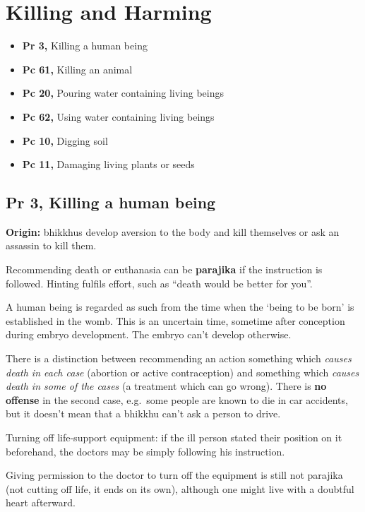 \chapter{Killing and Harming}

\begin{itemize}
\tightlist
\item
  \textbf{Pr 3,} Killing a human being
\item
  \textbf{Pc 61,} Killing an animal
\item
  \textbf{Pc 20,} Pouring water containing living beings
\item
  \textbf{Pc 62,} Using water containing living beings
\item
  \textbf{Pc 10,} Digging soil
\item
  \textbf{Pc 11,} Damaging living plants or seeds
\end{itemize}

\section{Pr 3, Killing a human being}


\textbf{Origin:} bhikkhus develop aversion to the body and kill
themselves or ask an assassin to kill them.

Recommending death or euthanasia can be \textbf{parajika} if the
instruction is followed. Hinting fulfils effort, such as ``death would
be better for you''.

A human being is regarded as such from the time when the `being to be
born' is established in the womb. This is an uncertain time, sometime
after conception during embryo development. The embryo can't develop
otherwise.

\enlargethispage*{\baselineskip}

There is a distinction between recommending an action something which
\emph{causes death in each case} (abortion or active contraception) and
something which \emph{causes death in some of the cases} (a treatment
which can go wrong). There is \textbf{no offense} in the second case,
e.g.~some people are known to die in car accidents, but it doesn't mean
that a bhikkhu can't ask a person to drive.

Turning off life-support equipment: if the ill person stated their
position on it beforehand, the doctors may be simply following his
instruction.

Giving permission to the doctor to turn off the equipment is still not
parajika (not cutting off life, it ends on its own), although one might
live with a doubtful heart afterward.

